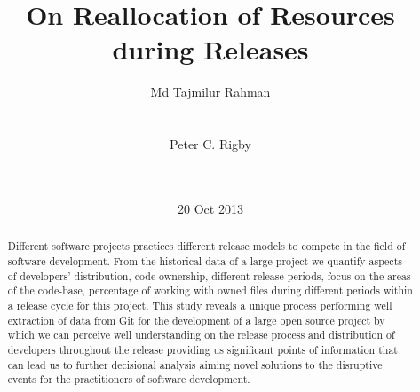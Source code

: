 \documentclass{acm_proc_article-sp}
\begin{document}
\title{On Reallocation of Resources during Releases }
\author{
\alignauthor
Md Tajmilur Rahman\\
       \\
       \\
\alignauthor
Peter C. Rigby\\
       \\
       \\
}
\date{20 Oct 2013}
\maketitle

\begin{abstract}
Different software projects practices different release models to compete in the field of software development. From the historical data of a large project we quantify aspects of developers' distribution, code ownership, different release periods, focus on the areas of the code-base, percentage of working with owned files during different periods within a release cycle for this project. This study reveals a unique process performing well extraction of data from Git for the development of a large open source project by which we can perceive well understanding on the release process and distribution of developers throughout the release providing us significant points of information that can lead us to further decisional analysis aiming novel solutions to the disruptive events for the practitioners of software development.
\end{abstract}

\end{document}
